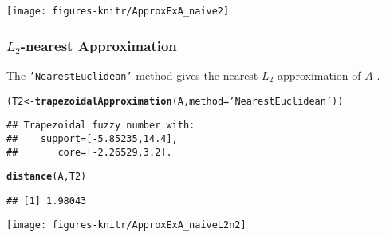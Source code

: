 \documentclass[11pt]{article}\usepackage{graphicx, color}
\makeatletter
\newcommand{\hlfunctioncall}[1]{\textcolor[rgb]{0.501960784313725,0,0.329411764705882}{\textbf{#1}}}%
\newcommand{\hlstring}[1]{\textcolor[rgb]{0.6,0.6,1}{#1}}%
\newenvironment{kframe}{%
 \def\at@end@of@kframe{}%
 \ifinner\ifhmode%
  \def\at@end@of@kframe{\end{minipage}}%
  \begin{minipage}{\columnwidth}%
 \fi\fi%
 \def\FrameCommand##1{\hskip\@totalleftmargin \hskip-\fboxsep
 \colorbox{shadecolor}{##1}\hskip-\fboxsep
     \hskip-\linewidth \hskip-\@totalleftmargin \hskip\columnwidth}%
 \MakeFramed {\advance\hsize-\width
   \@totalleftmargin\z@ \linewidth\hsize
   \@setminipage}}%
 {\par\unskip\endMakeFramed%
 \at@end@of@kframe}
\newenvironment{knitrout}{}{} %
\makeatother
\begin{document}
\begin{center}
\begin{knitrout}\small
{}\color{fgcolor}

{\centering \texttt{[image: figures-knitr/ApproxExA\_naive2]} 

}



\end{knitrout}

\end{center}



\subsubsection{$L_2$-nearest Approximation}


The \texttt{'NearestEuclidean'} method
gives the nearest $L_2$-approximation of $A$
\cite[Corollary 8]{Ban2009}.


\begin{knitrout}\small
{}\color{fgcolor}\begin{kframe}
\begin{alltt}
(T2 <- \hlfunctioncall{trapezoidalApproximation}(A, method=\hlstring{'NearestEuclidean'}))
\end{alltt}
\begin{verbatim}
## Trapezoidal fuzzy number with:
##    support=[-5.85235,14.4],
##       core=[-2.26529,3.2].
\end{verbatim}
\begin{alltt}
\hlfunctioncall{distance}(A, T2)
\end{alltt}
\begin{verbatim}
## [1] 1.98043
\end{verbatim}
\end{kframe}
\end{knitrout}


\begin{center}
\begin{knitrout}\small
{}\color{fgcolor}

{\centering \texttt{[image: figures-knitr/ApproxExA\_naiveL2n2]} 

}



\end{knitrout}

\end{center}
\end{document}
